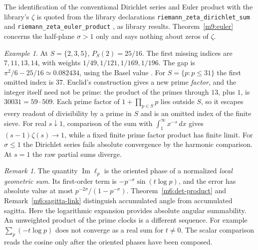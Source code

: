 \documentclass[11pt,reqno]{amsart}
\theoremstyle{definition}
\theoremstyle{remark}
\newtheorem{remark}[theorem]{Remark}
\newtheorem{example}[theorem]{Example}
\numberwithin{equation}{section}
\begin{document}
{\sloppy The identification of the conventional Dirichlet series and Euler product
with the library's \(\zeta\) is quoted from the library declarations
\texttt{riemann\_zeta\_dirichlet\_sum} and
\texttt{riemann\_zeta\_euler\_product} \cite{Tru}, as library results.
Theorem~\ref{m9:euler} concerns the half-plane \(\sigma>1\) only and says
nothing about zeros of \(\zeta\).\par}

\begin{example}\label{m9:sieve}
At \(S=\{2,3,5\}\), \(P_S(2)=25/16\). The first missing
indices are \(7,11,13,14\), with weights \(1/49,1/121,1/169,1/196\).
The gap is \(\pi^2/6-25/16\simeq0.082434\), using the Basel
value \cite[Eq.~25.6.1]{m9:DLMF}. For \(S=\{p:p\le31\}\) the
first omitted index is \(37\). Euclid's construction gives a new prime
\emph{factor}, and the integer itself need not be prime: the product of the
primes through \(13\), plus \(1\), is \(30031=59\cdot509\). Each prime
factor of \(1+\prod_{p\in S}p\) lies outside \(S\), so it escapes every
readout of divisibility by a prime in \(S\) and is an omitted index of the
finite sieve. For real \(s\downarrow1\), comparison of
the sum with \(\int_1^\infty x^{-s}\,dx\) gives
\((s-1)\zeta(s)\to1\), while a fixed finite prime factor product
has finite limit. For \(\sigma\le1\) the Dirichlet series fails
absolute convergence by the harmonic comparison. At \(s=1\) the
raw partial sums diverge.
\end{example}

\begin{remark}\label{m9:sagitta}
The quantity \(\operatorname{Im}\ell_p\) is the oriented
phase of a normalized \emph{local geometric sum}. Its
first-order term is \(-p^{-\sigma}\sin(t\log p)\), and the
error has absolute value at most \(p^{-2\sigma}/(1-p^{-\sigma})\).
Theorem~\ref{m6:det-product} and Remark~\ref{m6:sagitta-link}
distinguish accumulated angle from accumulated sagitta. Here
the logarithmic expansion provides absolute angular summability.
An unweighted product of the prime clocks is a different
sequence. For example \(\sum_{p}(-t\log p)\) does not converge
as a real sum for \(t\ne0\). The scalar comparison reads the
cosine only after the oriented phases have been composed.
\end{remark}
\end{document}
